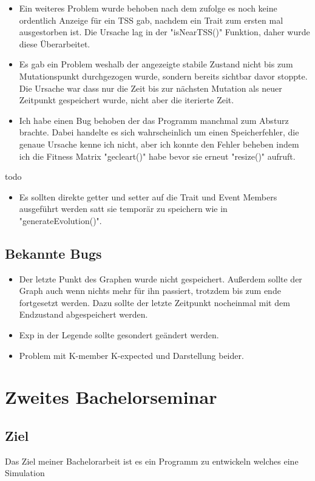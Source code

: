 \documentclass{article}
\begin{document}
\begin{itemize}
	\item Ein weiteres Problem wurde behoben nach dem zufolge es noch keine ordentlich Anzeige für ein TSS gab, nachdem ein Trait zum ersten mal ausgestorben ist. Die Ursache lag in der "{}isNearTSS()"{} Funktion, daher wurde diese Überarbeitet.
	\item Es gab ein Problem weshalb der angezeigte stabile Zustand nicht bis zum Mutationspunkt durchgezogen wurde, sondern bereits sichtbar davor stoppte. Die Ursache war dass nur die Zeit bis zur nächsten Mutation als neuer Zeitpunkt gespeichert wurde, nicht aber die iterierte Zeit.
	\item Ich habe einen Bug behoben der das Programm manchmal zum Absturz brachte. Dabei handelte es sich wahrscheinlich um einen Speicherfehler, die genaue Ursache kenne ich nicht, aber ich konnte den Fehler beheben indem ich die Fitness Matrix "{}gecleart()"{} habe bevor sie erneut "{}resize()"{} aufruft.
\end{itemize}
todo
\begin{itemize}
 \item Es sollten direkte getter und setter auf die Trait und Event Members ausgeführt werden satt sie temporär zu speichern wie in "{}generateEvolution()"{}. 
\end{itemize}
\subsection{Bekannte Bugs}
\begin{itemize}
	 \item Der letzte Punkt des Graphen wurde nicht gespeichert. Außerdem sollte der Graph auch wenn nichts mehr für ihn passiert, trotzdem bis zum ende fortgesetzt werden. Dazu sollte der letzte Zeitpunkt nocheinmal mit dem Endzustand abgespeichert werden. 
	 \item Exp in der Legende sollte gesondert geändert werden.
	 \item Problem mit K-member K-expected und Darstellung beider.
\end{itemize}

\newpage
\section{Zweites Bachelorseminar}
	\subsection{Ziel}
	Das Ziel meiner Bachelorarbeit ist es ein Programm zu entwickeln welches eine Simulation 
\end{document}
